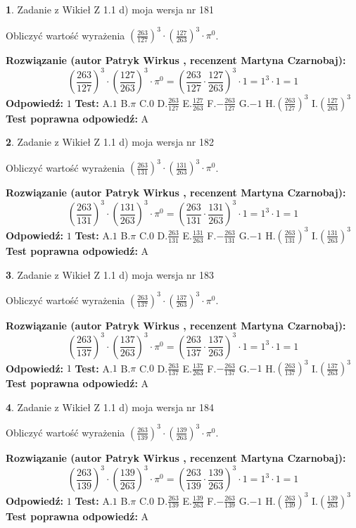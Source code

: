 \documentclass[12pt, a4paper]{article}
\theoremstyle{definition} %
\newtheorem{zad}{}
\newcommand{\zadStart}[1]{\begin{zad}#1\newline}
\newcommand{\zadStop}{\end{zad}}
\newcommand{\rozwStart}[2]{\noindent \textbf{Rozwiązanie (autor #1 , recenzent #2): }\newline}
\newcommand{\rozwStop}{\newline}
\newcommand{\odpStart}{\noindent \textbf{Odpowiedź:}\newline}
\newcommand{\odpStop}{\newline}
\newcommand{\testStart}{\noindent \textbf{Test:}\newline}
\newcommand{\testStop}{\newline}
\newcommand{\kluczStart}{\noindent \textbf{Test poprawna odpowiedź:}\newline}
\newcommand{\kluczStop}{\newline}
\begin{document}
\zadStart{Zadanie z Wikieł Z 1.1 d) moja wersja nr 181}

Obliczyć wartość wyrażenia $(\frac{263}{127})^{3} \cdot (\frac{127}{263})^{3} \cdot \pi^{0}$.
\zadStop
\rozwStart{Patryk Wirkus}{Martyna Czarnobaj}
$$(\frac{263}{127})^{3} \cdot (\frac{127}{263})^{3} \cdot \pi^{0} = (\frac{263}{127} \cdot \frac{127}{263})^{3} \cdot 1 = 1^{3} \cdot 1 = 1$$
\rozwStop
\odpStart
$1$
\odpStop
\testStart
A.$1$ B.$\pi$ C.$0$ D.$\frac{263}{127}$ E.$\frac{127}{263}$
F.$-\frac{263}{127}$ G.$-1$
H.$(\frac{263}{127})^{3}$
I.$(\frac{127}{263})^{3}$
\testStop
\kluczStart
A
\kluczStop



\zadStart{Zadanie z Wikieł Z 1.1 d) moja wersja nr 182}

Obliczyć wartość wyrażenia $(\frac{263}{131})^{3} \cdot (\frac{131}{263})^{3} \cdot \pi^{0}$.
\zadStop
\rozwStart{Patryk Wirkus}{Martyna Czarnobaj}
$$(\frac{263}{131})^{3} \cdot (\frac{131}{263})^{3} \cdot \pi^{0} = (\frac{263}{131} \cdot \frac{131}{263})^{3} \cdot 1 = 1^{3} \cdot 1 = 1$$
\rozwStop
\odpStart
$1$
\odpStop
\testStart
A.$1$ B.$\pi$ C.$0$ D.$\frac{263}{131}$ E.$\frac{131}{263}$
F.$-\frac{263}{131}$ G.$-1$
H.$(\frac{263}{131})^{3}$
I.$(\frac{131}{263})^{3}$
\testStop
\kluczStart
A
\kluczStop



\zadStart{Zadanie z Wikieł Z 1.1 d) moja wersja nr 183}

Obliczyć wartość wyrażenia $(\frac{263}{137})^{3} \cdot (\frac{137}{263})^{3} \cdot \pi^{0}$.
\zadStop
\rozwStart{Patryk Wirkus}{Martyna Czarnobaj}
$$(\frac{263}{137})^{3} \cdot (\frac{137}{263})^{3} \cdot \pi^{0} = (\frac{263}{137} \cdot \frac{137}{263})^{3} \cdot 1 = 1^{3} \cdot 1 = 1$$
\rozwStop
\odpStart
$1$
\odpStop
\testStart
A.$1$ B.$\pi$ C.$0$ D.$\frac{263}{137}$ E.$\frac{137}{263}$
F.$-\frac{263}{137}$ G.$-1$
H.$(\frac{263}{137})^{3}$
I.$(\frac{137}{263})^{3}$
\testStop
\kluczStart
A
\kluczStop



\zadStart{Zadanie z Wikieł Z 1.1 d) moja wersja nr 184}

Obliczyć wartość wyrażenia $(\frac{263}{139})^{3} \cdot (\frac{139}{263})^{3} \cdot \pi^{0}$.
\zadStop
\rozwStart{Patryk Wirkus}{Martyna Czarnobaj}
$$(\frac{263}{139})^{3} \cdot (\frac{139}{263})^{3} \cdot \pi^{0} = (\frac{263}{139} \cdot \frac{139}{263})^{3} \cdot 1 = 1^{3} \cdot 1 = 1$$
\rozwStop
\odpStart
$1$
\odpStop
\testStart
A.$1$ B.$\pi$ C.$0$ D.$\frac{263}{139}$ E.$\frac{139}{263}$
F.$-\frac{263}{139}$ G.$-1$
H.$(\frac{263}{139})^{3}$
I.$(\frac{139}{263})^{3}$
\testStop
\kluczStart
A
\kluczStop
\end{document}
